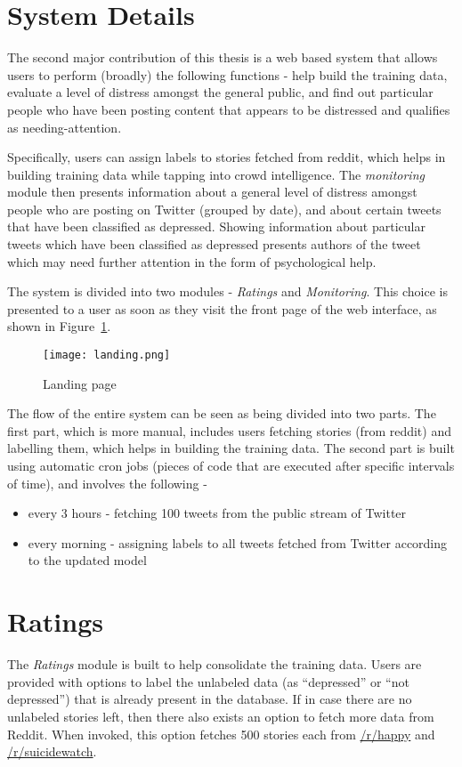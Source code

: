 \section{System Details}

The second major contribution of this thesis is a web based system that allows users to perform (broadly) the following functions - help build the training data, evaluate a level of distress amongst the general public, and find out particular people who have been posting content that appears to be distressed and qualifies as needing-attention.

Specifically, users can assign labels to stories fetched from reddit, which helps in building training data while tapping into crowd intelligence. The \emph{monitoring} module then presents information about a general level of distress amongst people who are posting on Twitter (grouped by date), and about certain tweets that have been classified as depressed. Showing information about particular tweets which have been classified as depressed presents authors of the tweet which may need further attention in the form of psychological help.

The system is divided into two modules - \emph{Ratings} and \emph{Monitoring}. This choice is presented to a user as soon as they visit the front page of the web interface, as shown in Figure~\ref{landing}.
\begin{figure}
    \centering
    \texttt{[image: landing.png]}
    \caption{Landing page}
    \label{landing}
\end{figure}

The flow of the entire system can be seen as being divided into two parts. The first part, which is more manual, includes users fetching stories (from reddit) and labelling them, which helps in building the training data. The second part is built using automatic cron jobs (pieces of code that are executed after specific intervals of time), and involves the following -
\begin{itemize}
    \item{every 3 hours - fetching 100 tweets from the public stream of Twitter}
    \item{every morning - assigning labels to all tweets fetched from Twitter according to the updated model}
\end{itemize}

\section{Ratings}
The \emph{Ratings} module is built to help consolidate the training data. Users are provided with options to label the unlabeled data (as ``depressed'' or ``not depressed'') that is already present in the database. If in case there are no unlabeled stories left, then there also exists an option to fetch more data from Reddit. When invoked, this option fetches 500 stories each from \href{http://www.reddit.com/r/happy}{/r/happy} and \href{http://www.reddit.com/r/suicidewatch}{/r/suicidewatch}.

